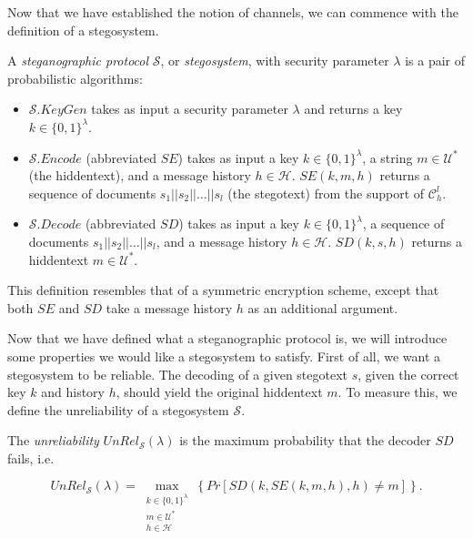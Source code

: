 Now that we have established the notion of channels, we can commence with the definition of a stegosystem.
\begin{definition}
\label{def:stegosystem}
A \emph{steganographic protocol} $\mathcal{S}$, or \emph{stegosystem}, with security parameter $\lambda$ is a pair of probabilistic algorithms:

\begin{itemize}
  \item $\mathcal{S}.KeyGen$ takes as input a security parameter $\lambda$ and returns a key $k \in \{0,1\}^\lambda$.
  \item $\mathcal{S}.Encode$ (abbreviated $SE$) takes as input a key $k \in \{0,1\}^\lambda$, a string $m \in \mathcal{U}^*$ (the hiddentext), and a message history $h \in \mathcal{H}$.
    $SE(k, m, h)$ returns a sequence of documents $s_1||s_2||\dots||s_l$ (the stegotext) from the support of $\mathcal{C}_h^l$.
  \item $\mathcal{S}.Decode$ (abbreviated $SD$) takes as input a key $k \in \{0,1\}^\lambda$, a sequence of documents $s_1||s_2||\dots||s_l$, and a message history $h \in \mathcal{H}$.
    $SD(k, s, h)$ returns a hiddentext $m \in \mathcal{U}^*$.
\end{itemize}
\end{definition}

This definition resembles that of a symmetric encryption scheme, except that both $SE$ and $SD$ take a message history $h$ as an additional argument.

Now that we have defined what a steganographic protocol is, we will introduce some properties we would like a stegosystem to satisfy.
First of all, we want a stegosystem to be reliable.
The decoding of a given stegotext $s$, given the correct key $k$ and history $h$, should yield the original hiddentext $m$.
To measure this, we define the unreliability of a stegosystem $\mathcal{S}$.

\begin{definition}
\label{def:unreliability}
The \emph{unreliability} $UnRel_{\mathcal{S}}(\lambda)$ is the maximum probability that the decoder $SD$ fails, i.e.	

$$UnRel_{\mathcal{S}}(\lambda) = \max_{\substack{k \in \{0,1\}^\lambda\\m \in \mathcal{U}^*\\ h \in \mathcal{H}}}\left\{ Pr[SD(k, SE(k,m,h), h) \neq m] \right\}.$$
\end{definition}

